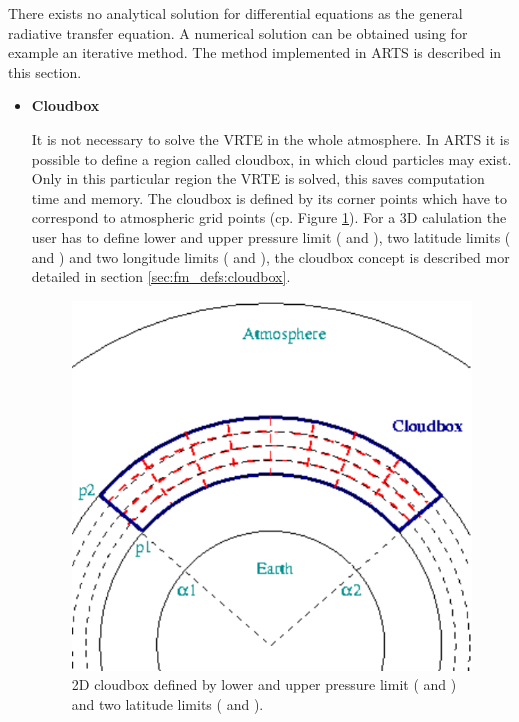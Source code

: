\label{sec:scattering:solution_rte}

There exists no analytical solution for differential equations as the
general radiative transfer equation. A numerical solution can be
obtained using for example an iterative method. The method implemented
in ARTS is described in this section.

\begin{itemize}
\item{\bf Cloudbox}
  
  It is not necessary to solve the VRTE in the whole atmosphere. In
  ARTS it is possible to define a region called cloudbox, in which
  cloud particles may exist. Only in this particular region the VRTE
  is solved, this saves computation time and memory.  The cloudbox is
  defined by its corner points which have to correspond to atmospheric
  grid points (cp. Figure \ref{fig:scattering:cloudbox}). For a 3D
  calulation the user has to define lower and upper pressure limit
  ( and ), two latitude limits ( and )
  and two longitude limits ( and ), the cloudbox
  concept is described mor detailed in section
  \ref{sec:fm_defs:cloudbox}.

\begin{figure}[htbp]
 \begin{center}
  \begin{minipage}[c]{0.65\textwidth}
   \begin{center}
     \includegraphics*[width=0.9\hsize]{Figs/scattering/cloudbox}
   \end{center}
  \end{minipage}%
  \begin{minipage}[c]{0.35\textwidth}
   \caption{2D cloudbox defined by lower and upper pressure limit ( and ) and two latitude limits ( and ).}
   \label{fig:scattering:cloudbox}
  \end{minipage}
 \end{center}
\end{figure}   


\end{itemize}
